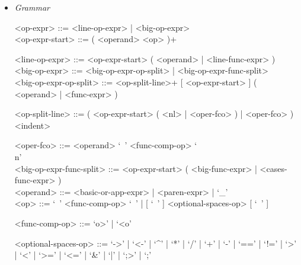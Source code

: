 \documentclass{article}
\begin{document}
\begin{itemize}
\begin{verbatim}
"Hello, I'm a big string that's going to contain multiple values from " +
"inside the imaginary program that I'm a part of. Here they are:\n" +
"value1 = " + value1 + ", value2 = " + value2 + ", value3 = " + value3 +
", value4 = " + value4 + ", value5 = " + value5
\end{verbatim}

\textbf{Description}

It is possible to stretch a (big) operator expression over multiple lines.
In that case:
\begin{itemize}
\item
The operator expression must split in a new line after an operator (not an
operand).

\item
Every line after the first must be indented so that in begins at the column
where the first line of the operator expression begun.

\item
The precise indentation rules are described in the section
"Indentation System" \ref{subsubsec:indsys}.
\end{itemize}

\item \textit{Grammar}
\begin{grammar}
<op-expr> ::= <line-op-expr> | <big-op-expr>
\\

<op-expr-start> ::= ( <operand> <op> )+

<line-op-expr> ::= <op-expr-start> ( <operand> | <line-func-expr> )
\\

<big-op-expr> ::=
<big-op-expr-op-split> | <big-op-expr-func-split>
\\

<big-op-expr-op-split> ::=
<op-split-line>+ [ <op-expr-start> ] ( <operand> | <func-expr> )

<op-split-line> ::=
( <op-expr-start> ( <nl> | <oper-fco> ) | <oper-fco> ) <indent>

<oper-fco> ::= <operand> `\ ' <func-comp-op> `\\n'
\\

<big-op-expr-func-split> ::=
<op-expr-start> ( <big-func-expr> | <cases-func-expr> )
\\

<operand> ::= <basic-or-app-expr> | <paren-expr> | `_'
\\

<op> ::= `\ ' <func-comp-op> `\ ' | [ `\ ' ] <optional-spaces-op> [ `\ ' ]

<func-comp-op> ::= `o>' | `<o'

<optional-spaces-op> ::=
`->' | `<-' | `^' | `*' | `/' | `+' | `-' | `==' | `!=' | `>' | `<' | `>=' |
`<=' | `\&' | `|' | `;>' | `;'
\end{grammar}
\end{itemize}
\end{document}
